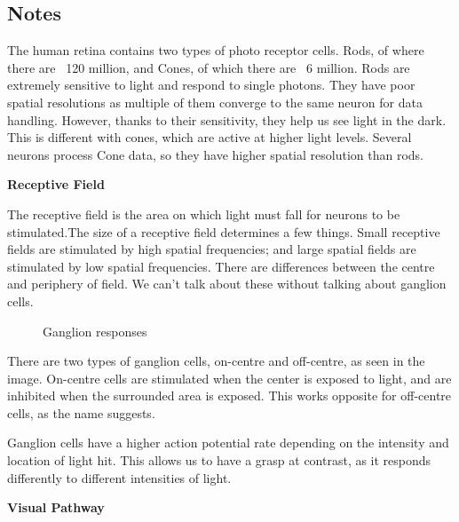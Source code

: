 \subsection{Notes}
The human retina contains two types of photo receptor cells. Rods, of where there are ~120 million, and Cones, of which there are ~6 million. Rods are extremely sensitive to light and respond to single photons. They have poor spatial resolutions as multiple of them converge to the same neuron for data handling. However, thanks to their sensitivity, they help us see light in the dark.
This is different with cones, which are active at higher light levels. Several neurons process Cone data, so they have higher spatial resolution than rods.

\textbf{Receptive Field}

The receptive field is the area on which light must fall for neurons to be stimulated.The size of a receptive field determines a few things. Small receptive fields are stimulated by high spatial frequencies; and large spatial fields are stimulated by low spatial frequencies.  There are differences between the centre and periphery of field. We can't talk about these without talking about ganglion cells.
\begin{figure}[!htb]
	\caption{\label{fig:lens} Ganglion responses}
\end{figure}
There are two types of ganglion cells, on-centre and off-centre, as seen in the image. On-centre cells are stimulated when the center is exposed to light, and are inhibited when the surrounded area is exposed. This works opposite for off-centre cells, as the name suggests.

Ganglion cells have a higher action potential rate depending on the intensity and location of light hit. This allows us to have a grasp at contrast, as it responds differently to different intensities of light.

\textbf{Visual Pathway}


